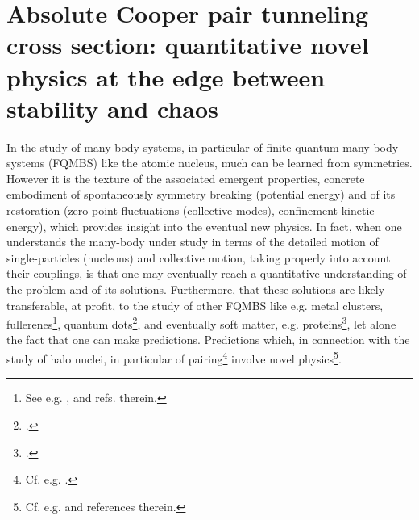 \section[Absolute Cooper pair tunneling cross section]{Absolute Cooper pair tunneling cross section: quantitative novel physics at the edge between stability and chaos}\label{App3C}
In the study of many-body systems, in particular of finite quantum many-body systems (FQMBS) like the atomic nucleus, much can be learned from symmetries.  However it is the texture of the associated emergent properties, concrete embodiment of spontaneously symmetry breaking (potential energy) and of its restoration (zero point fluctuations (collective modes), confinement kinetic energy), which provides insight into the eventual new physics. In fact, when one understands the many-body under study in terms of the detailed motion of single-particles (nucleons) and collective motion, taking properly into account their couplings, is that one  may eventually reach a  quantitative understanding of the problem and of its solutions. Furthermore, that these solutions are likely transferable, at profit, to the study of other FQMBS like e.g. metal clusters, fullerenes\footnote{See e.g. \cite{Gunnarsson:04}, \cite{Broglia:04b} and refs. therein.}, quantum dots\footnote{\cite{Lipparini:03}.}, and eventually soft matter, e.g.  proteins\footnote{\cite{Broglia:13b}.}, let alone the fact that one can make predictions. Predictions which, in connection with the study of halo nuclei, in particular of pairing\footnote{Cf. e.g. \cite{Broglia:13}.} involve  novel physics\footnote{Cf. e.g. \cite{Barranco:01,Tanihata:08,Potel:10} and references therein.}.



